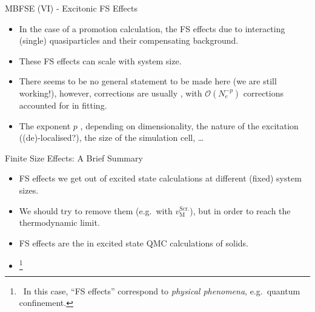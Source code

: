 \documentclass[12pt, pdf, hyperref={draft}, usenames, dvipsnames,
aspectratio=169]{beamer}
\newcommand{\red}[1]{{\bf\color{LancsRed}{#1}}}
\newcommand{\blue}[1]{{\bf\color{NavyBlue}{#1}}}
\newcommand{\green}[1]{{\bf\color{ForestGreen}{#1}}}
\begin{document}
\begin{frame}{MBFSE (VI) - Excitonic FS Effects}
\begin{itemize}

  \item In the case of a promotion calculation, the FS effects \red{are not}
  due to interacting (single) quasiparticles and their compensating background.

  \item These FS effects can scale \blue{differently} with system size.

  \item There seems to be no general statement to be made here (we are still
  working!), however, corrections are usually \blue{extrapolated}, with
  $\mathcal{O}(N_e^{-p})$ corrections accounted for in fitting.

  \item The exponent $p$ \blue{changes on a study-by-study basis}, depending on
  dimensionality, the nature of the excitation ((de)-localised?), the size of
  the simulation cell, \ldots

\end{itemize}
\end{frame}


%
%
%


\begin{frame}{Finite Size Effects: A Brief Summary}

\begin{itemize}
  \item FS effects \red{alter the numbers} we get out of excited state
  calculations at different (fixed) system sizes.

  \item We should try to remove them (e.g.\ with $v^{\text{Scr.}}_{\text{M}}$),
  but \blue{usually also need to extrapolate} in order to reach the
  thermodynamic limit.

  \item FS effects are the \red{dominant source of error} in excited state QMC
  calculations of solids.

  \item \green{None of the nasty FS effects we're currently having trouble with
  affect calculations on aperiodic (truly finite) systems.}\footnote{\ In this
  case, ``FS effects'' correspond to \textit{physical phenomena}, e.g.\ quantum
  confinement.}

\end{itemize}
\end{frame}
\end{document}
